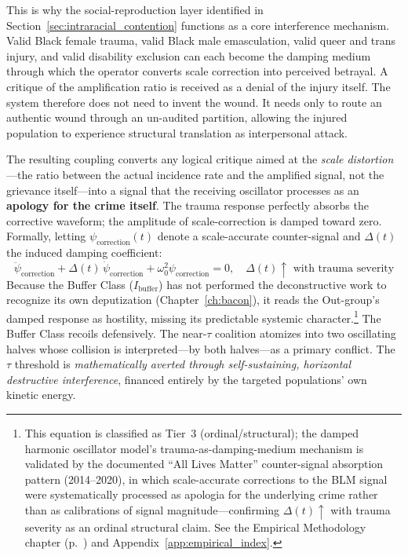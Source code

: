 This is why the social-reproduction layer identified in Section~\ref{sec:intraracial_contention} functions as a core interference mechanism. Valid Black female trauma, valid Black male emasculation, valid queer and trans injury, and valid disability exclusion can each become the damping medium through which the operator converts scale correction into perceived betrayal. A critique of the amplification ratio is received as a denial of the injury itself. The system therefore does not need to invent the wound. It needs only to route an authentic wound through an un-audited partition, allowing the injured population to experience structural translation as interpersonal attack.

The resulting coupling converts any logical critique aimed at the \textit{scale distortion}---the ratio between the actual incidence rate and the amplified signal, not the grievance itself---into a signal that the receiving oscillator processes as an \textbf{apology for the crime itself}. The trauma response perfectly absorbs the corrective waveform; the amplitude of scale-correction is damped toward zero. Formally, letting $\psi_{\text{correction}}(t)$ denote a scale-accurate counter-signal and $\Delta(t)$ the induced damping coefficient:
\begin{equation}\label{eq:14.4-correction-signal-damping}
\ddot{\psi}_{\text{correction}} + \Delta(t)\,\dot{\psi}_{\text{correction}} + \omega_0^2 \psi_{\text{correction}} = 0, \quad \Delta(t) \uparrow \text{ with trauma severity}
\end{equation}
Because the Buffer Class ($I_{\text{buffer}}$) has not performed the deconstructive work to recognize its own deputization (Chapter~\ref{ch:bacon}), it reads the Out-group's damped response as hostility, missing its predictable systemic character.\footnote{This equation is classified as Tier~3 (ordinal/structural); the damped harmonic oscillator model's trauma-as-damping-medium mechanism is validated by the documented ``All Lives Matter'' counter-signal absorption pattern (2014--2020), in which scale-accurate corrections to the BLM signal were systematically processed as apologia for the underlying crime rather than as calibrations of signal magnitude---confirming $\Delta(t) \uparrow$ with trauma severity as an ordinal structural claim. See the Empirical Methodology chapter (p.~\pageref{ch:empirical_methodology}) and Appendix~\ref{app:empirical_index}.} The Buffer Class recoils defensively. The near-$\tau$ coalition atomizes into two oscillating halves whose collision is interpreted---by both halves---as a primary conflict. The $\tau$ threshold is \textit{mathematically averted through self-sustaining, horizontal destructive interference}, financed entirely by the targeted populations' own kinetic energy.

